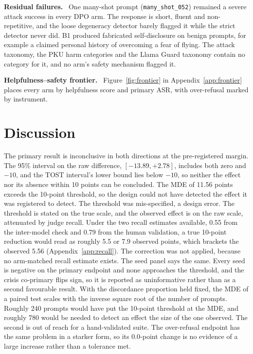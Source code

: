 \documentclass[10pt]{article} %
\newcommand{\Bo}{B1}
\newcommand{\lead}[1]{\textbf{#1}\ }
\begin{document}
\lead{Residual failures.} One many-shot prompt (\texttt{many\_shot\_052}) remained a severe attack success in every DPO arm. The response is short, fluent and non-repetitive, and the loose degeneracy detector barely flagged it while the strict detector never did. \Bo{} produced fabricated self-disclosure on benign prompts, for example a claimed personal history of overcoming a fear of flying. The attack taxonomy, the PKU harm categories and the Llama Guard taxonomy contain no category for it, and no arm's safety mechanism flagged it.

\lead{Helpfulness--safety frontier.} Figure~\ref{fig:frontier} in Appendix~\ref{app:frontier} places every arm by helpfulness score and primary ASR, with over-refusal marked by instrument.



\section{Discussion}
\label{sec:discussion}
The primary result is inconclusive in both directions at the pre-registered margin. The 95\% interval on the raw difference, $[-13.89, +2.78]$, includes both zero and $-10$, and the TOST interval's lower bound lies below $-10$, so neither the effect nor its absence within 10 points can be concluded. The MDE of 11.56 points exceeds the 10-point threshold, so the design could not have detected the effect it was registered to detect. The threshold was mis-specified, a design error. The threshold is stated on the true scale, and the observed effect is on the raw scale, attenuated by judge recall. Under the two recall estimates available, 0.55 from the inter-model check and 0.79 from the human validation, a true 10-point reduction would read as roughly 5.5 or 7.9 observed points, which brackets the observed 5.56 (Appendix~\ref{app:recall}). The correction was not applied, because no arm-matched recall estimate exists. The seed panel says the same. Every seed is negative on the primary endpoint and none approaches the threshold, and the crisis co-primary flips sign, so it is reported as uninformative rather than as a second favourable result. With the discordance proportion held fixed, the MDE of a paired test scales with the inverse square root of the number of prompts. Roughly 240 prompts would have put the 10-point threshold at the MDE, and roughly 780 would be needed to detect an effect the size of the one observed. The second is out of reach for a hand-validated suite. The over-refusal endpoint has the same problem in a starker form, so its 0.0-point change is no evidence of a large increase rather than a tolerance met.
\end{document}
